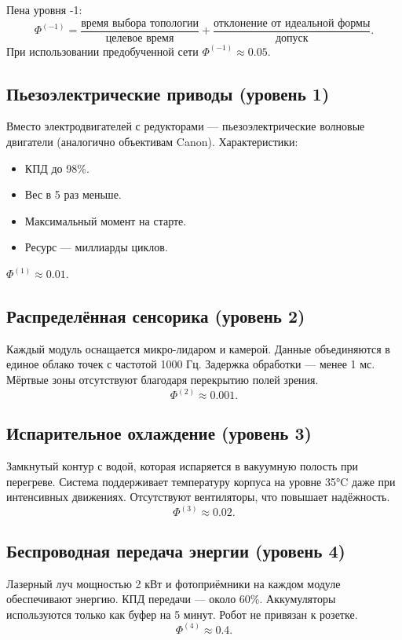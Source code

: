 \documentclass[12pt,a4paper]{article}
\begin{document}
Пена уровня -1:
\[
\Phi^{(-1)} = \frac{\text{время выбора топологии}}{\text{целевое время}} + \frac{\text{отклонение от идеальной формы}}{\text{допуск}}.
\]
При использовании предобученной сети \(\Phi^{(-1)} \approx 0.05\).

\subsection{Пьезоэлектрические приводы (уровень 1)}

Вместо электродвигателей с редукторами — пьезоэлектрические волновые двигатели (аналогично объективам Canon). Характеристики:
\begin{itemize}
    \item КПД до 98\%.
    \item Вес в 5 раз меньше.
    \item Максимальный момент на старте.
    \item Ресурс — миллиарды циклов.
\end{itemize}
\(\Phi^{(1)} \approx 0.01\).

\subsection{Распределённая сенсорика (уровень 2)}

Каждый модуль оснащается микро-лидаром и камерой. Данные объединяются в единое облако точек с частотой 1000 Гц. Задержка обработки — менее 1 мс. Мёртвые зоны отсутствуют благодаря перекрытию полей зрения.
\[
\Phi^{(2)} \approx 0.001.
\]

\subsection{Испарительное охлаждение (уровень 3)}

Замкнутый контур с водой, которая испаряется в вакуумную полость при перегреве. Система поддерживает температуру корпуса на уровне 35°C даже при интенсивных движениях. Отсутствуют вентиляторы, что повышает надёжность.
\[
\Phi^{(3)} \approx 0.02.
\]

\subsection{Беспроводная передача энергии (уровень 4)}

Лазерный луч мощностью 2 кВт и фотоприёмники на каждом модуле обеспечивают энергию. КПД передачи — около 60\%. Аккумуляторы используются только как буфер на 5 минут. Робот не привязан к розетке.
\[
\Phi^{(4)} \approx 0.4.
\]
\end{document}

